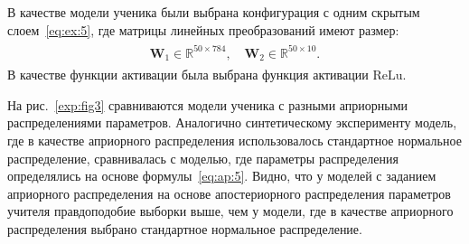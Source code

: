 \documentclass[12pt]{a&t}
\begin{document}
В качестве модели ученика были выбрана конфигурация с одним скрытым слоем~\eqref{eq:ex:5}, где матрицы линейных преобразований имеют размер:
\begin{gather}
\label{eq:ex:7}
\begin{aligned}
\mathbf{W}_{1} \in \mathbb{R}^{50 \times 784}, \quad \mathbf{W}_{2} \in \mathbb{R}^{50 \times 10}.
\end{aligned}
\end{gather}
В качестве функции активации была выбрана функция активации $\text{ReLu}$.

На рис.~\ref{exp:fig3} сравниваются модели ученика с разными априорными распределениями параметров.
Аналогично синтетическому эксперименту модель, где в качестве априорного распределения использовалось стандартное нормальное распределение, сравнивалась с моделью, где параметры распределения определялись на основе формулы~\eqref{eq:ap:5}. Видно, что у моделей с заданием априорного распределения на основе апостериорного распределения параметров учителя правдоподобие выборки выше, чем у модели, где в качестве априорного распределения выбрано стандартное нормальное распределение.
\end{document}

